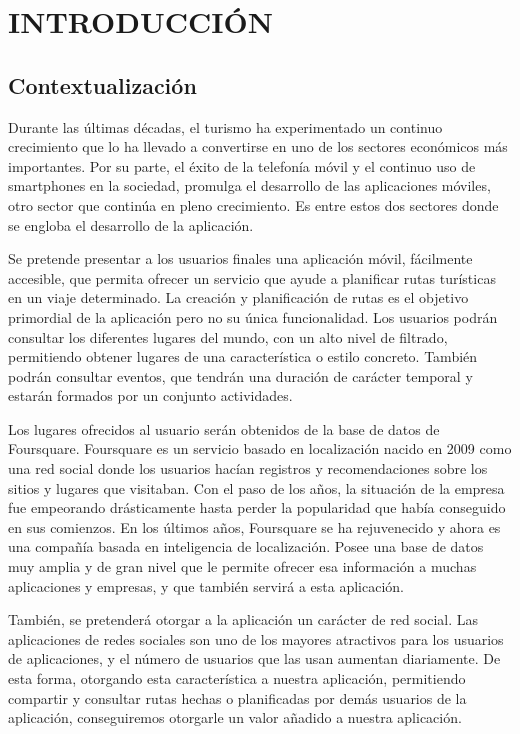 \setcounter{page}{1}
\chapter[Introducción]{
  \label{chp:introduccion}
  INTRODUCCIÓN
}
\thispagestyle{numberingStyle}
\pagestyle{numberingStyle}


\section{Contextualización}
Durante las últimas décadas, el turismo ha experimentado un continuo crecimiento que lo ha llevado a convertirse en uno de los sectores económicos más importantes. Por su parte, el éxito de la telefonía móvil y el continuo uso de smartphones en la sociedad, promulga el desarrollo de las aplicaciones móviles, otro sector que continúa en pleno crecimiento. Es entre estos dos sectores donde se engloba el desarrollo de la aplicación.

Se pretende presentar a los usuarios finales una aplicación móvil, fácilmente accesible, que permita ofrecer un servicio que ayude a planificar rutas turísticas en un viaje determinado. La creación y planificación de rutas es el objetivo primordial de la aplicación pero no su única funcionalidad. Los usuarios podrán consultar los diferentes lugares del mundo, con un alto nivel de filtrado, permitiendo obtener lugares de una característica o estilo concreto. También podrán consultar eventos, que tendrán una duración de carácter temporal y estarán formados por un conjunto actividades.

Los lugares ofrecidos al usuario serán obtenidos de la base de datos de Foursquare. Foursquare es un servicio basado en localización nacido en 2009 como una red social donde los usuarios hacían registros y recomendaciones sobre los sitios y lugares que visitaban. Con el paso de los años, la situación de la empresa fue empeorando drásticamente hasta perder la popularidad que había conseguido en sus comienzos. En los últimos años, Foursquare se ha rejuvenecido y ahora es una compañía basada en inteligencia de localización. Posee una base de datos muy amplia y de gran nivel que le permite ofrecer esa información a muchas aplicaciones y empresas, y que también servirá a esta aplicación.

También, se pretenderá otorgar a la aplicación un carácter de red social. Las aplicaciones de redes sociales son uno de los mayores atractivos para los usuarios de aplicaciones, y el número de usuarios que las usan aumentan diariamente. De esta forma, otorgando esta característica a nuestra aplicación, permitiendo compartir y consultar rutas hechas o planificadas por demás usuarios de la aplicación, conseguiremos otorgarle un valor añadido a nuestra aplicación.


